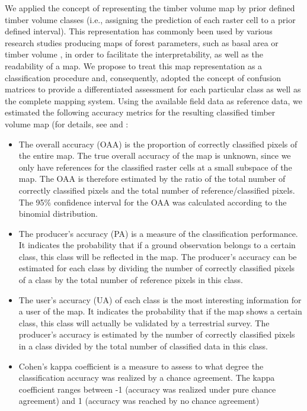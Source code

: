 We applied the concept of representing the timber volume map by prior defined timber volume classes (i.e., assigning the prediction of each raster cell to a prior defined interval). This representation has commonly been used by various research studies producing maps of forest parameters, such as basal area or timber volume \citep{tonolli2011, latifi2010, clementel2012}, in order to facilitate the interpretability, as well as the readability of a map. We propose to treat this map representation as a classification procedure and, consequently, adopted the concept of confusion matrices to provide a differentiated assessment for each particular class as well as the complete mapping system. Using the available field data as reference data, we estimated the following accuracy metrics for the resulting classified timber volume map (for details, see \citet{congalton2008} and \citet{richards1999}:

\begin{itemize}
	\item The overall accuracy (OAA) is the proportion of correctly classified pixels of the entire map. The true overall accuracy of the map is unknown, since we only have references for the classified raster cells at a small subspace of the map. The OAA is therefore estimated by the ratio of the total number of correctly classified pixels and the total number of reference/classified pixels. The 95\% confidence interval for the OAA was calculated according to the binomial distribution.
	\item 	The producer's accuracy (PA) is a measure of the classification performance. It indicates the probability that if a ground observation belongs to a certain class, this class will be reflected in the map. The producer's accuracy can be estimated for each class by dividing the number of correctly classified pixels of a class by the total number of reference pixels in this class.
	\item The user's accuracy (UA) of each class is the most interesting information for a user of the map. It indicates the probability that if the map shows a certain class, this class will actually be validated by a terrestrial survey. The producer's accuracy is estimated by the number of correctly classified pixels in a class divided by the total number of classified data in this class.
	\item Cohen's kappa coefficient is a measure to assess to what degree the classification accuracy was realized by a chance agreement. The kappa coefficient ranges between -1 (accuracy was realized under pure chance agreement) and 1 (accuracy was reached by no chance agreement)
\end{itemize}

